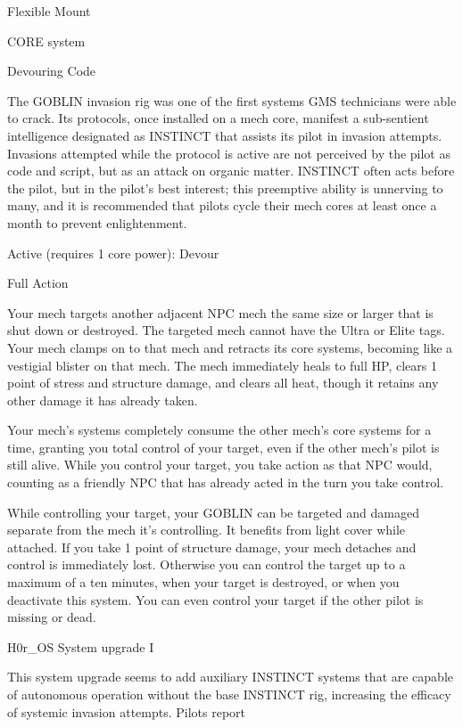   Flexible Mount

                                                CORE system




                                                  Devouring Code

  The GOBLIN invasion rig was one of the first systems GMS technicians were able to crack. Its
  protocols, once installed on a mech core, manifest a sub-sentient intelligence designated as INSTINCT
  that assists its pilot in invasion attempts. Invasions attempted while the protocol is active are not
  perceived by the pilot as code and script, but as an attack on organic matter. INSTINCT often acts
  before the pilot, but in the pilot’s best interest; this preemptive ability is unnerving to many, and it is
  recommended that pilots cycle their mech cores at least once a month to prevent enlightenment.

  Active (requires 1 core power): Devour

  Full Action

  Your mech targets another adjacent NPC mech the same size or larger that is shut down or destroyed.
  The targeted mech cannot have the Ultra or Elite tags. Your mech clamps on to that mech and retracts
  its core systems, becoming like a vestigial blister on that mech. The mech immediately heals to full HP,
  clears 1 point of stress and structure damage, and clears all heat, though it retains any other damage it
  has already taken.


  Your mech’s systems completely consume the other mech’s core systems for a time, granting you total
  control of your target, even if the other mech’s pilot is still alive. While you control your target, you take
  action as that NPC would, counting as a friendly NPC that has already acted in the turn you take
  control.


  While controlling your target, your GOBLIN can be targeted and damaged separate from the mech it’s
  controlling. It benefits from light cover while attached. If you take 1 point of structure damage, your
  mech detaches and control is immediately lost. Otherwise you can control the target up to a maximum
  of a ten minutes, when your target is destroyed, or when you deactivate this system. You can even
  control your target if the other pilot is missing or dead.

H0r\_OS System upgrade I

This system upgrade seems to add auxiliary INSTINCT systems that are capable of autonomous operation
without the base INSTINCT rig, increasing the efficacy of systemic invasion attempts. Pilots report

